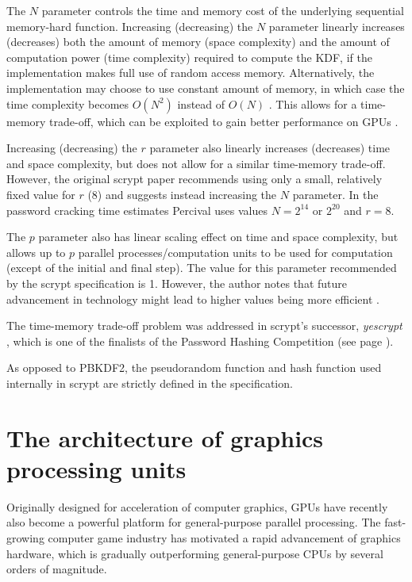 \documentclass[12pt,oneside]{fithesis2}
\begin{document}
      The $N$ parameter controls the time and memory cost of the underlying sequential memory-hard function. Increasing (decreasing) the $N$ parameter linearly increases (decreases) both the amount of memory (space complexity) and the amount of computation power (time complexity) required to compute the KDF, if the implementation makes full use of random access memory. Alternatively, the implementation may choose to use constant amount of memory, in which case the time complexity becomes $O(N^2)$ instead of $O(N)$ \cite[chapter 5, proof of theorem 1]{scrypt}. This allows for a time-memory trade-off, which can be exploited to gain better performance on GPUs \cite{scrypt:tradeoff, openwall:pwHashing}.
      
      Increasing (decreasing) the $r$ parameter also linearly increases (decreases) time and space complexity, but does not allow for a similar time-memory trade-off. However, the original scrypt paper recommends using only a small, relatively fixed value for $r$ (8) and suggests instead increasing the $N$ parameter. In the password cracking time estimates \cite[chapter 8]{scrypt} Percival uses values $N = 2^{14}$ or $2^{20}$ and $r = 8$.
      
      The $p$ parameter also has linear scaling effect on time and space complexity, but allows up to $p$ parallel processes/computation units to be used for computation (except of the initial and final step). The value for this parameter recommended by the scrypt specification is 1. However, the author notes that future advancement in technology might lead to higher values being more efficient \cite[chapter 7]{scrypt}.
      
      The time-memory trade-off problem was addressed in scrypt's successor, \emph{yescrypt} \cite{yescrypt}, which is one of the finalists of the Password Hashing Competition (see page \pageref{p:phc}).
      
      As opposed to PBKDF2, the pseudorandom function and hash function used internally in scrypt are strictly defined in the specification.
      
    \chapter{The architecture of graphics processing units} \label{ch:gpuArch}
      Originally designed for acceleration of computer graphics, GPUs have recently also become a powerful platform for general-purpose parallel processing. The fast-growing computer game industry has motivated a rapid advancement of graphics hardware, which is gradually outperforming general-purpose CPUs by several orders of magnitude.
      
\end{document}
